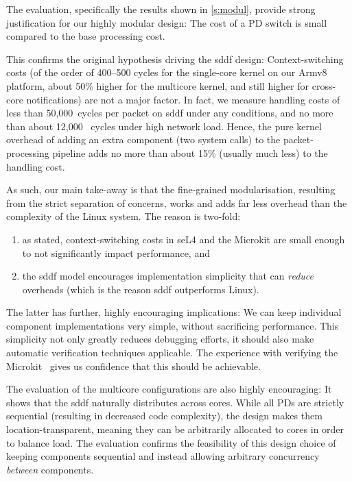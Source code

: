 \documentclass[a4paper,12pt]{report}
\begin{document}
The evaluation, specifically the results shown in \autoref{s:modul},
provide strong justification for our highly modular design: The cost
of a PD switch is small compared to the base processing cost.

This confirms the original hypothesis driving
the \gls{sddf} design: Context-switching costs (of the order of 400--500 cycles
for the single-core kernel on our Armv8 platform, about 50\% higher
for the multicore kernel, and still higher for cross-core
notifications) are not a major factor. In fact, we measure
handling costs of less than 50,000~cycles per packet on \gls{sddf} under any
conditions, and no more than about 12,000~ cycles under high network
load. Hence, the pure kernel overhead of adding an extra component
(two system calls) to
the packet-processing pipeline adds no more than about 15\% (usually
much less) to the handling cost.

As such, our main take-away is that the fine-grained modularisation,
resulting from the strict separation of concerns, works and adds
far less overhead than the complexity of the Linux system. The reason is two-fold:
\begin{enumerate}
\item as stated, context-switching costs in seL4 and the Microkit are
  small enough to not significantly impact performance, and
\item the \gls{sddf} model encourages implementation simplicity that can
  \emph{reduce} overheads (which is the reason \gls{sddf} outperforms Linux).
\end{enumerate}

The latter has further, highly encouraging implications: We can keep
individual component implementations very simple, without sacrificing
performance. This simplicity not only greatly reduces debugging
efforts, it should also make automatic verification techniques
applicable. The experience with verifying the
Microkit~\citep{Paturel_SH_23} gives us confidence that this should be
achievable.

The evaluation of the multicore configurations are also highly encouraging: It shows that the \gls{sddf}
naturally distributes across cores. While all PDs are strictly
sequential (resulting in decreased code complexity), the design makes
them location-transparent, meaning they can be arbitrarily allocated to cores
in order to balance load. The evaluation confirms the feasibility of
this design choice of keeping components sequential and instead allowing arbitrary concurrency
\emph{between} components.
\end{document}
